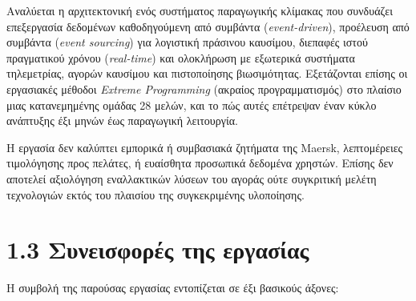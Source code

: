 \documentclass[11pt,a4paper,greek,twoside]{template-xe}
\begin{document}
Αναλύεται η αρχιτεκτονική ενός συστήματος παραγωγικής κλίμακας που
συνδυάζει επεξεργασία δεδομένων καθοδηγούμενη από συμβάντα
(\emph{event-driven}), προέλευση από συμβάντα (\emph{event sourcing})
για λογιστική πράσινου καυσίμου, διεπαφές ιστού πραγματικού χρόνου
(\emph{real-time}) και ολοκλήρωση με εξωτερικά συστήματα τηλεμετρίας,
αγορών καυσίμου και πιστοποίησης βιωσιμότητας. Εξετάζονται επίσης οι
εργασιακές μέθοδοι \emph{Extreme Programming} (ακραίος προγραμματισμός)
στο πλαίσιο μιας κατανεμημένης ομάδας 28 μελών, και το πώς αυτές
επέτρεψαν έναν κύκλο ανάπτυξης έξι μηνών έως παραγωγική λειτουργία.

Η εργασία δεν καλύπτει εμπορικά ή συμβασιακά ζητήματα της Maersk,
λεπτομέρειες τιμολόγησης προς πελάτες, ή ευαίσθητα προσωπικά δεδομένα
χρηστών. Επίσης δεν αποτελεί αξιολόγηση εναλλακτικών λύσεων του αγοράς
ούτε συγκριτική μελέτη τεχνολογιών εκτός του πλαισίου της συγκεκριμένης
υλοποίησης.

\section{1.3 Συνεισφορές της
εργασίας}\label{ux3c3ux3c5ux3bdux3b5ux3b9ux3c3ux3c6ux3bfux3c1ux3adux3c2-ux3c4ux3b7ux3c2-ux3b5ux3c1ux3b3ux3b1ux3c3ux3afux3b1ux3c2}

Η συμβολή της παρούσας εργασίας εντοπίζεται σε έξι βασικούς άξονες:
\end{document}
